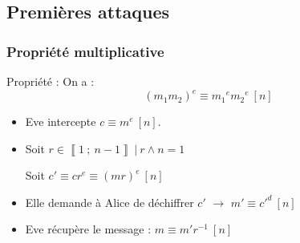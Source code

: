 \documentclass{beamer}
\newcommand{\nset}[2]{\left\llbracket #1\ ;\ #2 \right\rrbracket}
\newcommand{\lr}[1]{\left( #1 \right)}
\begin{document}
    \subsection{Premières attaques}

    \begin{frame}
        \frametitle{Propriété multiplicative}

        \begin{block}{Propriété :}
            On a :
            \[
                \lr{m_1 m_2}^e \equiv {m_1}^e {m_2}^e\ [n]
            \]
        \end{block}

        \vspace{12pt}
        
        \begin{itemize}
            \item<2-> Eve intercepte $c \equiv m^e\ [n]$.

            \item<3-> Soit $r \in \nset 1 {n - 1}\ |\ r \wedge n = 1$

             Soit $c' \equiv c r^e \equiv \lr{mr}^e\ [n]$

            \item<4-> Elle demande à Alice de déchiffrer $c'$ $\rightarrow$ $m' \equiv {c'}^d\ [n]$

            \item<5-> Eve récupère le message : $m \equiv m' r^{-1}\ [n]$
        \end{itemize}
    \end{frame}
\end{document}
